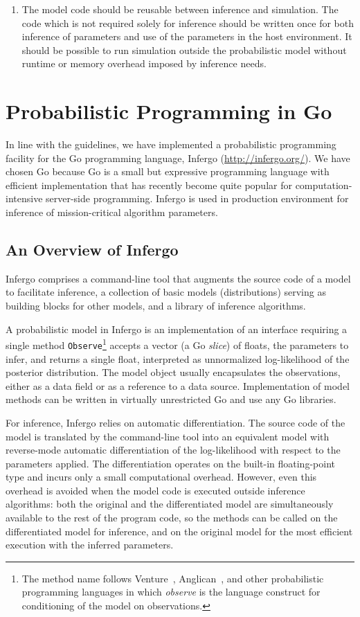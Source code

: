 \documentclass[sigplan,10pt,screen]{acmart}
\begin{document}
\begin{sloppypar}
\begin{enumerate}
\item The model code should be reusable between inference and
simulation. The code which is not required solely for inference
should be written once for both inference of parameters and use
of the parameters in the host environment.  It should be
possible to run simulation outside the probabilistic model without
runtime or memory overhead imposed by inference needs.
\end{enumerate}

\section{Probabilistic Programming in Go}

In line with the guidelines, we have implemented a probabilistic
programming facility for the Go programming language, Infergo
(\url{http://infergo.org/}). We have chosen Go because Go is a
small but expressive programming language with efficient
implementation that has recently become quite popular for
computation-intensive server-side programming. Infergo is used
in production environment for inference of mission-critical
algorithm parameters.

\subsection{An Overview of Infergo}

Infergo comprises a command-line tool that augments the source
code of a model to facilitate inference, a collection of basic
models (distributions) serving as building blocks for other
models, and a library of inference algorithms.

A probabilistic model in Infergo is an implementation of an
interface requiring a single method
\lstinline{Observe}\footnote{The method name follows
Venture~\cite{MSP14}, Anglican~\cite{TMY+16}, and other
probabilistic programming languages in which \textit{observe} is
the language construct for conditioning of the model on
observations.} accepts a vector (a Go \textit{slice}) of floats,
the parameters to infer, and returns a single float, interpreted
as unnormalized log-likelihood of the posterior distribution.
The model object usually encapsulates the observations, either
as a data field or as a reference to a data source.
Implementation of model methods can be written in virtually
unrestricted Go and use any Go libraries.

For inference, Infergo relies on automatic differentiation. The
source code of the model is translated by the command-line tool
into an equivalent model with reverse-mode automatic
differentiation of the log-likelihood with respect to the
parameters applied. The differentiation operates on the built-in
floating-point type and incurs only a small computational
overhead. However, even this overhead is avoided when the model
code is executed outside inference algorithms: both the original
and the differentiated model are simultaneously available to the
rest of the program code, so the methods can be called on the
differentiated model for inference, and on the original model
for the most efficient execution with the inferred parameters.


\end{sloppypar}
\end{document}

